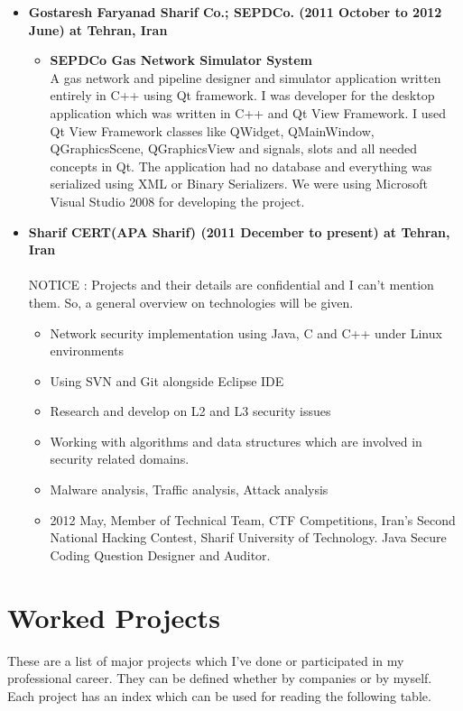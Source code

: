 \documentclass[12pt,a4paper]{article}
\begin{document}
\begin{itemize}
\begin{itemize}
			\end{itemize}
		\item \textbf{Gostaresh Faryanad Sharif Co.; SEPDCo. (2011 October to 2012 June) at Tehran, Iran}
			\begin{itemize}
				\item \small \textbf{SEPDCo Gas Network Simulator System} \\
				 A gas network and pipeline designer and simulator application written entirely in C++ using Qt framework. I was developer for the desktop application which was written in C++ and Qt View Framework. I used Qt View Framework classes like QWidget, QMainWindow, QGraphicsScene, QGraphicsView and signals, slots and all needed concepts in Qt. The application had no database and everything was serialized using XML or Binary Serializers. We were using Microsoft Visual Studio 2008 for developing the project. \\
			\end{itemize}
		\item \textbf{Sharif CERT(APA Sharif) (2011 December to present) at Tehran, Iran} \\ \\
		 NOTICE : Projects and their details are confidential and I can't mention them. So, a general overview on technologies will be given.
			\begin{itemize}
				\item Network security implementation using Java, C and C++ under Linux environments
				\item Using SVN and Git alongside Eclipse IDE
				\item Research and develop on L2 and L3 security issues
				\item Working with algorithms and data structures which are involved in security related domains. 
				\item Malware analysis, Traffic analysis, Attack analysis
				\item 2012 May, Member of Technical Team, CTF Competitions, Iran's Second National Hacking Contest, Sharif University of Technology. Java Secure Coding Question Designer and Auditor.
			\end{itemize}
	\end{itemize}
	
\section{Worked Projects}
			These are a list of major projects which I've done or participated in my professional career. They can be defined whether by companies or by myself. Each project has an index which can be used for reading the following table.
			
\end{document}
